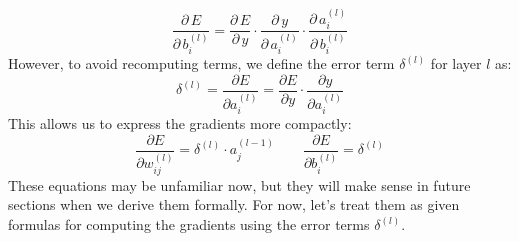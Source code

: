 \begin{examplebox}
\begin{equation*}
        \dfrac{\partial \, E}{\partial \, b_{i}^{(l)}} = \dfrac{\partial \, E}{\partial \, y} \cdot \dfrac{\partial \, y}{\partial \, a_{i}^{(l)}} \cdot \dfrac{\partial \, a_{i}^{(l)}}{\partial \, b_{i}^{(l)}}
    \end{equation*}
    However, to avoid recomputing terms, we define the error term $\delta^{(l)}$ for layer $l$ as:
    \begin{equation*}
        \delta^{(l)} = \dfrac{\partial E}{\partial a_{i}^{(l)}} = \dfrac{\partial E}{\partial y} \cdot \dfrac{\partial y}{\partial a_{i}^{(l)}}
    \end{equation*}
    This allows us to express the gradients more compactly:
    \begin{equation*}
        \dfrac{\partial E}{\partial w_{ij}^{(l)}} = \delta^{(l)} \cdot a_{j}^{(l-1)}
        \qquad
        \dfrac{\partial E}{\partial b_{i}^{(l)}} = \delta^{(l)}
    \end{equation*}
    These equations may be unfamiliar now, but they will make sense in future sections when we derive them formally.
    For now, let's treat them as given formulas for computing the gradients using the error terms $\delta^{(l)}$.


\end{examplebox}
